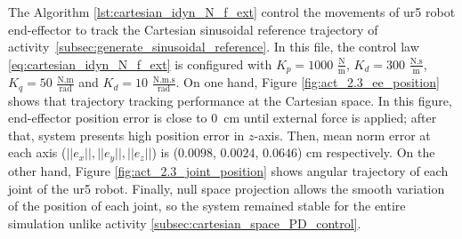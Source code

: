 The Algorithm \ref{lst:cartesian_idyn_N_f_ext} control the movements of ur5 robot end-effector to track the Cartesian sinusoidal reference trajectory of activity~\ref{subsec:generate_sinusoidal_reference}. In this file, the control law \eqref{eq:cartesian_idyn_N_f_ext} is configured with ${K_{p}}=1000$ $\mathrm{\frac{N}{m}}$, $K_{d}= 300$ $\mathrm{\frac{N.s}{m}}$, ${K_{q}}=50$ $\mathrm{\frac{N.m}{rad}}$ and $K_{d}= 10$ $\mathrm{\frac{N.m.s}{rad}}$. On one hand, Figure \ref{fig:act_2.3_ee_position} shows that trajectory tracking performance at the Cartesian space. In this figure, end-effector position error is close to $0$~cm until external force is applied; after that, system presents high position error in $z$-axis. Then, mean norm error at each axis ($||e_x||, ||e_y||, ||e_z||$) is ($0.0098$, $0.0024$, $0.0646$) cm respectively. On the other hand, Figure \ref{fig:act_2.3_joint_position} shows angular trajectory of each joint of the ur5 robot. Finally, null space projection allows the smooth variation of the position of each joint, so the system remained stable for the entire simulation unlike activity \ref{subsec:cartesian_space_PD_control}. \vspace{.5cm}

